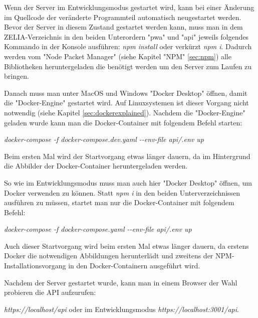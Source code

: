 
Wenn der Server im Entwicklungsmodus gestartet wird, kann bei einer Änderung im Quellcode der veränderte Programmteil automatisch neugestartet werden. Bevor der Server in diesem Zustand gestartet werden kann, muss man in dem ZELIA-Verzeichnis in den beiden Unterordern "pwa" und "api" jeweils folgendes Kommando in der Konsole ausführen: \emph{npm install} oder verkürzt \emph{npm i}. Dadurch werden vom "Node Packet Manager" (siehe Kapitel "NPM" \ref{sec:npm}) alle Bibliotheken heruntergeladen die benötigt werden um den Server zum Laufen zu bringen.

Danach muss man unter MacOS und Windows "Docker Desktop" öffnen, damit die "Docker-Engine" gestartet wird. Auf Linuxsystemen ist dieser Vorgang nicht notwendig (siehe Kapitel \ref{sec:dockerexplained}). Nachdem die "Docker-Engine" geladen wurde kann man die Docker-Container mit folgendem Befehl starten:

\emph{docker-compose -f docker-compose.dev.yaml -{}-env-file api/.env up}  

Beim ersten Mal wird der Startvorgang etwas länger dauern, da im Hintergrund die Abbilder der Docker-Container heruntergeladen werden.


So wie im Entwicklungsmodus muss man auch hier "Docker Desktop" öffnen, um Docker verwenden zu können. Statt \emph{npm i} in den beiden Unterverzeichnissen ausführen zu müssen, startet man nur die Docker-Container mit folgendem Befehl:

\emph{docker-compose -f docker-compose.yaml -{}-env-file api/.env up}

Auch dieser Startvorgang wird beim ersten Mal etwas länger dauern, da erstens Docker die notwendigen Abbildungen herunterlädt und zweitens der NPM-Installationsvorgang in den Docker-Containern ausgeführt wird.

Nachdem der Server gestartet wurde, kann man in einem Browser der Wahl probieren die API aufzurufen:

\emph{https://localhost/api} oder im Entwicklungsmodus \emph{https://localhost:3001/api}.